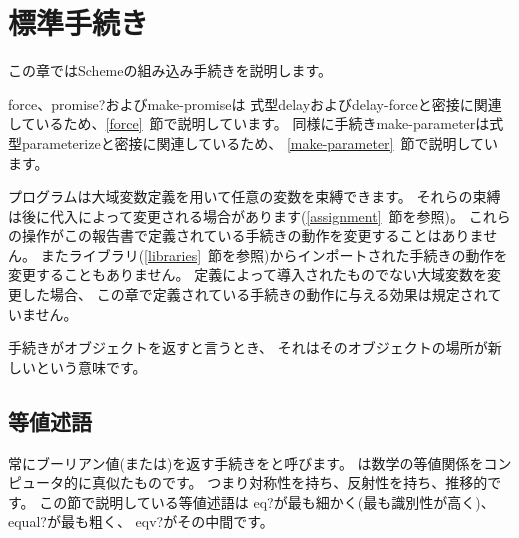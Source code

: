 
\chapter{標準手続き}
\label{initialenv}
\label{builtinchapter}


この章ではSchemeの組み込み手続きを説明します。

{\cf force}、{\cf promise?}および{\cf make-promise}は
式型{\cf delay}および{\cf delay-force}と密接に関連しているため、\ref{force}~節で説明しています。
同様に手続き{\cf make-\+parameter}は式型{\cf parameterize}と密接に関連しているため、
\ref{make-parameter}~節で説明しています。

プログラムは大域変数定義を用いて任意の変数を束縛できます。
それらの束縛は後に代入によって変更される場合があります(\ref{assignment}~節を参照)。
これらの操作がこの報告書で定義されている手続きの動作を変更することはありません。
またライブラリ(\ref{libraries}~節を参照)からインポートされた手続きの動作を変更することもありません。
定義によって導入されたものでない大域変数を変更した場合、
この章で定義されている手続きの動作に与える効果は規定されていません。

手続きがオブジェクトを返すと言うとき、
それはそのオブジェクトの場所が新しいという意味です。

\section{等値述語}
\label{equivalencesection}

常にブーリアン値(\schtrue{}または\schfalse)を返す手続きをと呼びます。
は数学の等値関係をコンピュータ的に真似たものです。
つまり対称性を持ち、反射性を持ち、推移的です。
この節で説明している等値述語は
{\cf eq?}が最も細かく(最も識別性が高く)、
{\cf equal?}が最も粗く、
{\cf eqv?}がその中間です。


